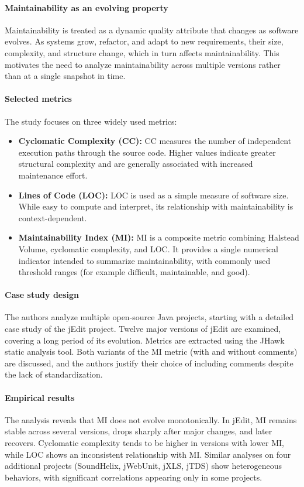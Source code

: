 \documentclass[11pt,a4paper]{article}
\begin{document}
\paragraph{Maintainability as an evolving property}
Maintainability is treated as a dynamic quality attribute that changes as software evolves. As systems grow, refactor, and adapt to new requirements, their size, complexity, and structure change, which in turn affects maintainability. This motivates the need to analyze maintainability across multiple versions rather than at a single snapshot in time.

\paragraph{Selected metrics}
The study focuses on three widely used metrics:
\begin{itemize}[leftmargin=*]
  \item \textbf{Cyclomatic Complexity (CC):} CC measures the number of independent execution paths through the source code. Higher values indicate greater structural complexity and are generally associated with increased maintenance effort.
  \item \textbf{Lines of Code (LOC):} LOC is used as a simple measure of software size. While easy to compute and interpret, its relationship with maintainability is context-dependent.
  \item \textbf{Maintainability Index (MI):} MI is a composite metric combining Halstead Volume, cyclomatic complexity, and LOC. It provides a single numerical indicator intended to summarize maintainability, with commonly used threshold ranges (for example difficult, maintainable, and good).
\end{itemize}

\paragraph{Case study design}
The authors analyze multiple open-source Java projects, starting with a detailed case study of the jEdit project. Twelve major versions of jEdit are examined, covering a long period of its evolution. Metrics are extracted using the JHawk static analysis tool. Both variants of the MI metric (with and without comments) are discussed, and the authors justify their choice of including comments despite the lack of standardization.

\paragraph{Empirical results}
The analysis reveals that MI does not evolve monotonically. In jEdit, MI remains stable across several versions, drops sharply after major changes, and later recovers. Cyclomatic complexity tends to be higher in versions with lower MI, while LOC shows an inconsistent relationship with MI. Similar analyses on four additional projects (SoundHelix, jWebUnit, jXLS, jTDS) show heterogeneous behaviors, with significant correlations appearing only in some projects.
\end{document}
